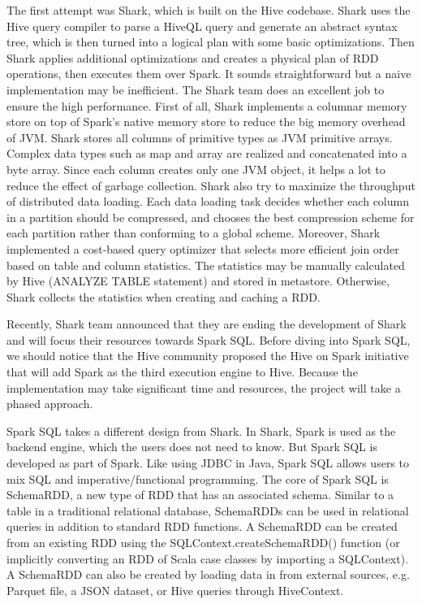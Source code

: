 \documentclass[12pt]{book}
\begin{document}
The first attempt was Shark, which is built on the Hive codebase. Shark uses the Hive query compiler to parse a HiveQL query and generate an abstract syntax tree, which is then turned into a logical plan with some basic optimizations. Then Shark applies additional optimizations and creates a physical plan of RDD operations, then executes them over Spark. It sounds straightforward but a naive implementation may be inefficient. The Shark team does an excellent job to ensure the high performance. First of all, Shark implements a columnar memory store on top of Spark's native memory store to reduce the big memory overhead of JVM. Shark stores all columns of primitive types as JVM primitive arrays. Complex data types such as map and array are realized and concatenated into a byte array. Since each column creates only one JVM object, it helps a lot to reduce the effect of garbage collection. Shark also try to maximize the throughput of distributed data loading. Each data loading task decides whether each column in a partition should be compressed, and chooses the best compression scheme for each partition rather than conforming to a global scheme. Moreover, Shark implemented a cost-based query optimizer that selects more efficient join order based on table and column statistics. The statistics may be manually calculated by Hive (ANALYZE TABLE statement) and stored in metastore. Otherwise, Shark collects the statistics when creating and caching a RDD.

Recently, Shark team announced that they are ending the development of Shark and will focus their resources towards Spark SQL. Before diving into Spark SQL, we should notice that the Hive community proposed the Hive on Spark initiative that will add Spark as the third execution engine to Hive. Because the implementation may take significant time and resources, the project will take a phased approach.

Spark SQL takes a different design from Shark. In Shark, Spark is used as the backend engine, which the users does not need to know. But Spark SQL is developed as part of Spark. Like using JDBC in Java, Spark SQL allows users to mix SQL and imperative/functional programming. The core of Spark SQL is SchemaRDD, a new type of RDD that has an associated schema. Similar to a table in a traditional relational database, SchemaRDDs can be used in relational queries in addition to standard RDD functions. A SchemaRDD can be created from an existing RDD using the SQLContext.createSchemaRDD() function (or implicitly converting an RDD of Scala case classes by importing a SQLContext). A SchemaRDD can also be created by loading data in from external sources, e.g. Parquet file, a JSON dataset, or Hive queries through HiveContext.
\end{document}
